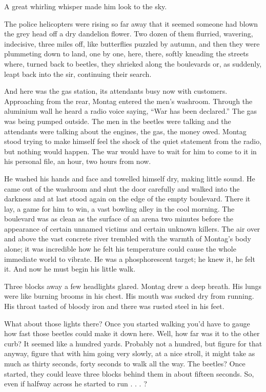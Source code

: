 \documentclass[11pt,openany]{book}
\begin{document}
A great whirling whisper made him look to the sky.

The police helicopters were rising so far away that it seemed someone had blown the grey head off a dry dandelion flower. Two dozen of them flurried, wavering, indecisive, three miles off, like butterflies puzzled by autumn, and then they were plummeting down to land, one by one, here, there, softly kneading the streets where, turned back to beetles, they shrieked along the boulevards or, as suddenly, leapt back into the sir, continuing their search.

And here was the gas station, its attendants busy now with customers. Approaching from the rear, Montag entered the men's washroom. Through the aluminium wall he heard a radio voice saying, ``War has been declared.'' The gas was being pumped outside. The men in the beetles were talking and the attendants were talking about the engines, the gas, the money owed. Montag stood trying to make himself feel the shock of the quiet statement from the radio, but nothing would happen. The war would have to wait for him to come to it in his personal file, an hour, two hours from now.

He washed his hands and face and towelled himself dry, making little sound. He came out of the washroom and shut the door carefully and walked into the darkness and at last stood again on the edge of the empty boulevard. There it lay, a game for him to win, a vast bowling alley in the cool morning. The boulevard was as clean as the surface of an arena two minutes before the appearance of certain unnamed victims and certain unknown killers. The air over and above the vast concrete river trembled with the warmth of Montag's body alone; it was incredible how he felt his temperature could cause the whole immediate world to vibrate. He was a phosphorescent target; he knew it, he felt it. And now he must begin his little walk.

Three blocks away a few headlights glared. Montag drew a deep breath. His lungs were like burning brooms in his chest. His mouth was sucked dry from running. His throat tasted of bloody iron and there was rusted steel in his feet.

What about those lights there? Once you started walking you'd have to gauge how fast those beetles could make it down here. Well, how far was it to the other curb? It seemed like a hundred yards. Probably not a hundred, but figure for that anyway, figure that with him going very slowly, at a nice stroll, it might take as much as thirty seconds, forty seconds to walk all the way. The beetles? Once started, they could leave three blocks behind them in about fifteen seconds. So, even if halfway across he started to run . . . ?
\end{document}

